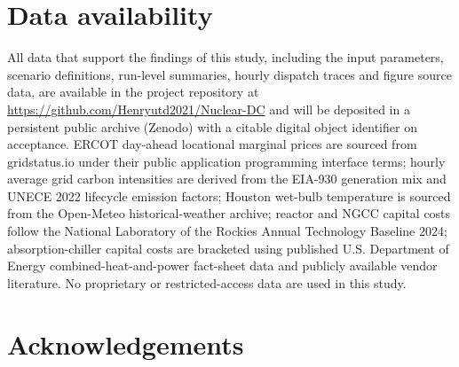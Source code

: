 \documentclass[a4paper,fleqn]{cas-sc}
\begin{document}
\section*{Data availability}
All data that support the findings of this study, including the input parameters, scenario definitions, run-level summaries, hourly dispatch traces and figure source data, are available in the project repository at \url{https://github.com/Henryutd2021/Nuclear-DC} and will be deposited in a persistent public archive (Zenodo) with a citable digital object identifier on acceptance. ERCOT day-ahead locational marginal prices are sourced from gridstatus.io under their public application programming interface terms; hourly average grid carbon intensities are derived from the EIA-930 generation mix and UNECE 2022 lifecycle emission factors; Houston wet-bulb temperature is sourced from the Open-Meteo historical-weather archive; reactor and NGCC capital costs follow the National Laboratory of the Rockies Annual Technology Baseline 2024; absorption-chiller capital costs are bracketed using published U.S. Department of Energy combined-heat-and-power fact-sheet data and publicly available vendor literature. No proprietary or restricted-access data are used in this study.


\section*{Acknowledgements}







\clearpage
\setcounter{section}{0}
\renewcommand{\thesection}{S\arabic{section}}
\renewcommand{\thesubsection}{S\arabic{section}.\arabic{subsection}}
\renewcommand{\thefigure}{S\arabic{figure}}\setcounter{figure}{0}
\renewcommand{\thetable}{S\arabic{table}}\setcounter{table}{0}
\renewcommand{\theequation}{S\arabic{equation}}\setcounter{equation}{0}
\renewcommand{\theHsection}{S\arabic{section}}
\renewcommand{\theHsubsection}{S\arabic{section}.\arabic{subsection}}
\renewcommand{\theHfigure}{S\arabic{figure}}
\renewcommand{\theHtable}{S\arabic{table}}
\renewcommand{\theHequation}{S\arabic{equation}}
\nolinenumbers
\end{document}
